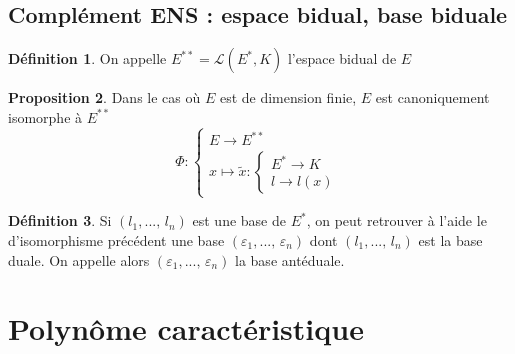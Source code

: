 \documentclass[10pt,a4paper]{article}
\theoremstyle{definition}
\newtheorem{proposition}{Proposition}[section]
\newtheorem{definition}[proposition]{Définition}
\begin{document}
\subsection{Complément ENS : espace bidual, base biduale}
\begin{definition}
On appelle $E^{**} = \mathcal{L}(E^*, K)$ l'espace bidual de $E$
\end{definition}
\begin{proposition}
Dans le cas où $E$ est de dimension finie, $E$ est canoniquement isomorphe à $E^{**}$
\[ \Phi : \begin{cases}
E \to E^{**} \\
x \mapsto \tilde{x} : \begin{cases}
E^* \to K\\
l \to l(x)
\end{cases}
\end{cases} \]
\end{proposition}
\begin{definition}
Si $(l_1, ...,\, l_n)$ est une base de $E^*$, on peut retrouver à l'aide le d'isomorphisme précédent une base $(\varepsilon_1, ...,\, \varepsilon_n)$ dont $(l_1, ...,\, l_n)$ est la base duale. On appelle alors $(\varepsilon_1, ...,\, \varepsilon_n)$ la base antéduale.
\end{definition}

\section{Polynôme caractéristique}
\end{document}
